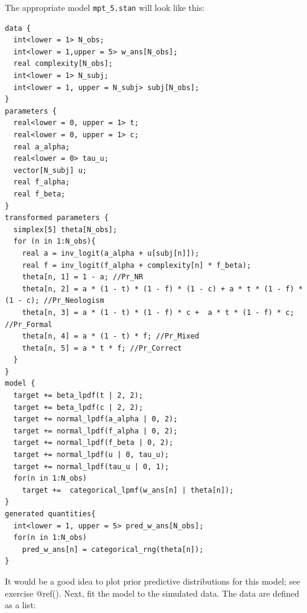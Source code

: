 \documentclass[12pt,]{krantz}
\newenvironment{Shaded}{\begin{snugshade}}{\end{snugshade}}
\newcommand{\KeywordTok}[1]{\textcolor[rgb]{0.13,0.29,0.53}{\textbf{#1}}}
\newcommand{\DataTypeTok}[1]{\textcolor[rgb]{0.13,0.29,0.53}{#1}}
\newcommand{\StringTok}[1]{\textcolor[rgb]{0.31,0.60,0.02}{#1}}
\newcommand{\OperatorTok}[1]{\textcolor[rgb]{0.81,0.36,0.00}{\textbf{#1}}}
\newcommand{\NormalTok}[1]{#1}
\theoremstyle{definition}
\theoremstyle{definition}
\theoremstyle{definition}
\theoremstyle{remark}
\begin{document}
The appropriate model \texttt{mpt\_5.stan} will look like this:

\begin{verbatim}
data {
  int<lower = 1> N_obs;
  int<lower = 1,upper = 5> w_ans[N_obs];
  real complexity[N_obs];
  int<lower = 1> N_subj;
  int<lower = 1, upper = N_subj> subj[N_obs];
}
parameters {
  real<lower = 0, upper = 1> t;
  real<lower = 0, upper = 1> c;
  real a_alpha;
  real<lower = 0> tau_u;
  vector[N_subj] u;
  real f_alpha;
  real f_beta;
}
transformed parameters {
  simplex[5] theta[N_obs];
  for (n in 1:N_obs){
    real a = inv_logit(a_alpha + u[subj[n]]);
    real f = inv_logit(f_alpha + complexity[n] * f_beta);
    theta[n, 1] = 1 - a; //Pr_NR
    theta[n, 2] = a * (1 - t) * (1 - f) * (1 - c) + a * t * (1 - f) * (1 - c); //Pr_Neologism
    theta[n, 3] = a * (1 - t) * (1 - f) * c +  a * t * (1 - f) * c;  //Pr_Formal
    theta[n, 4] = a * (1 - t) * f; //Pr_Mixed
    theta[n, 5] = a * t * f; //Pr_Correct
  }
}
model {
  target += beta_lpdf(t | 2, 2);
  target += beta_lpdf(c | 2, 2);
  target += normal_lpdf(a_alpha | 0, 2);
  target += normal_lpdf(f_alpha | 0, 2);
  target += normal_lpdf(f_beta | 0, 2);
  target += normal_lpdf(u | 0, tau_u);
  target += normal_lpdf(tau_u | 0, 1);
  for(n in 1:N_obs)
    target +=  categorical_lpmf(w_ans[n] | theta[n]);
}
generated quantities{
  int<lower = 1, upper = 5> pred_w_ans[N_obs];
  for(n in 1:N_obs)
    pred_w_ans[n] = categorical_rng(theta[n]);
}
\end{verbatim}

It would be a good idea to plot prior predictive distributions for this
model; see exercise @ref(). Next, fit the model to the simulated data.
The data are defined as a list:

\begin{Shaded}
\end{Shaded}
\end{document}
